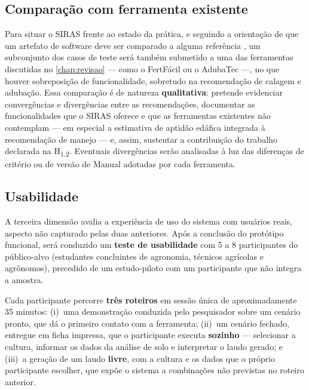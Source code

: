 \subsection{Comparação com ferramenta existente}\label{sec:val_comparacao}

Para situar o SIRAS frente ao estado da prática, e seguindo a orientação
de que um artefato de software deve ser comparado a alguma referência
\citep{Wazlawick2014}, um subconjunto dos casos de teste será também
submetido a uma das ferramentas discutidas no \cref{chap:revisao}
--- como o FertFácil \citep{Tiecher2016} ou o AdubaTec
\citep{AdubaTec2021} ---, no que houver sobreposição de funcionalidade,
sobretudo na recomendação de calagem e adubação. Essa comparação é de
natureza \textbf{qualitativa}: pretende evidenciar convergências e
divergências entre as recomendações, documentar as funcionalidades que o
SIRAS oferece e que as ferramentas existentes não contemplam --- em
especial a estimativa de aptidão edáfica integrada à recomendação de
manejo --- e, assim, sustentar a contribuição do trabalho declarada na
H\textsubscript{1.2}. Eventuais divergências serão analisadas à luz das
diferenças de critério ou de versão de Manual adotadas por cada
ferramenta.

\subsection{Usabilidade}\label{sec:val_usabilidade}

A terceira dimensão avalia a experiência de uso do sistema com usuários
reais, aspecto não capturado pelas duas anteriores. Após a conclusão do
protótipo funcional, será conduzido um \textbf{teste de usabilidade} com
5 a 8 participantes do público-alvo (estudantes concluintes de agronomia,
técnicos agrícolas e agrônomos), precedido de um estudo-piloto com um
participante que não integra a amostra.

Cada participante percorre \textbf{três roteiros} em sessão única de
aproximadamente 35 minutos: (i)~uma demonstração conduzida pelo
pesquisador sobre um cenário pronto, que dá o primeiro contato com a
ferramenta; (ii)~um cenário fechado, entregue em ficha impressa, que o
participante executa \textbf{sozinho} --- selecionar a cultura, informar
os dados da análise de solo e interpretar o laudo gerado; e (iii)~a
geração de um laudo \textbf{livre}, com a cultura e os dados que o
próprio participante escolher, que expõe o sistema a combinações não
previstas no roteiro anterior.

